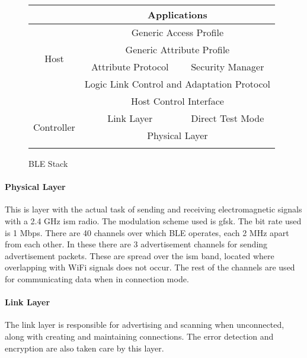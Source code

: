 \begin{figure}[h]
\begin{center}
\setlength{\extrarowheight}{1.5pt}
\begin{tabular}{|c||c|c|}
\cline{2-3}
\multicolumn{1}{c|}{} &  \multicolumn{ 2}{c|}{Applications} \\ \hline
\multirow{4}{*}{Host} & \multicolumn{ 2}{c|}{Generic Access Profile} \\ \cline{ 2- 3}
 & \multicolumn{ 2}{c|}{Generic Attribute Profile} \\ \cline{ 2- 3}
 & \multicolumn{1}{c|}{Attribute Protocol} & \multicolumn{1}{c|}{Security Manager} \\ \cline{ 2- 3}
 & \multicolumn{ 2}{c|}{Logic Link Control and Adaptation Protocol} \\ \hline 
\multicolumn{1}{c|}{} & \multicolumn{ 2}{c|}{Host Control Interface} \\ \hline
\multirow{2}{*}{Controller} & \multicolumn{1}{c|}{Link Layer} & \multicolumn{1}{c|}{Direct Test Mode} \\ \cline{ 2- 3}
 & \multicolumn{ 2}{c|}{Physical Layer} \\ \hline
\multicolumn{ 1}{c}{} & \multicolumn{1}{m{4cm}}{} & \multicolumn{1}{m{4cm}}{} \\ 
\end{tabular}
\end{center}
\vspace{-30pt}
\caption{BLE Stack}
\label{fig:StackBLE}
\vspace{-10pt}
\end{figure}

\paragraph{Physical Layer}
This is layer with the actual task of sending and receiving electromagnetic signals with a 2.4 GHz \gls{ism} radio. The modulation scheme used is \gls{gfsk}. The bit rate used is 1 Mbps. There are 40 channels over which BLE operates, each 2 MHz apart from each other. In these there are 3 advertisement channels for sending advertisement packets. These are spread over the \gls{ism} band, located where overlapping with WiFi signals does not occur. The rest of the channels are used for communicating data when in connection mode.

\paragraph{Link Layer}
The link layer is responsible for advertising and scanning when unconnected, along with creating and maintaining connections. The error detection and encryption are also taken care by this layer. 

